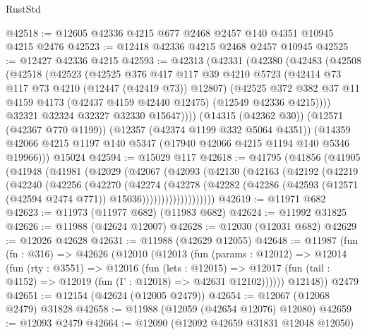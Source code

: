 \begin{lexlean}{RustStd}
\begin{coremodule}
@42518 := @12605 @42336 @4215 @677 @2468 @2457 @140 @4351 @10945 @4215 @2476
@42523 := @12418 @42336 @4215 @2468 @2457 @10945
@42525 := @12427 @42336 @4215
@42593 := @42313
    (@42331
      (@42380
        (@42483
          (@42508
            (@42518
              (@42523
                (@42525
                  @376
                  @417
                  @117
                  @39
                  @4210
                  @5723
                  (@42414 @73 @117 @73 @4210 (@12447 (@42419 @73)) @12807)
                  (@42525
                    @372
                    @382
                    @37
                    @11
                    @4159
                    @4173
                    (@42437 @4159 @42440 @12475)
                    (@12549 @42336 @4215))))
              @32321
              @32324
              @32327
              @32330
              @15647))))
      (@14315 (@42362 @30))
      (@12571 (@42367 @770 @1199))
      (@12357 (@42374 @1199 @332 @5064 @4351))
      (@14359 @42066 @4215 @1197 @140 @5347 (@17940 @42066 @4215 @1194 @140 @5346 @19966)))
    @15024
@42594 := @15029 @117
@42618 := @41795
    (@41856
      (@41905
        (@41948
          (@41981
            (@42029
              (@42067
                (@42093
                  (@42130
                    (@42163
                      (@42192
                        (@42219
                          (@42240
                            (@42256
                              (@42270
                                (@42274
                                  (@42278
                                    (@42282
                                      (@42286
                                        (@42593
                                          (@12571 (@42594 @2474 @771))
                                          @15036)))))))))))))))))))
@42619 := @11971 @682
@42623 := @11973 (@11977 @682) (@11983 @682)
@42624 := @11992 @31825
@42626 := @11988 (@42624 @12007)
@42628 := @12030 (@12031 @682)
@42629 := @12026 @42628
@42631 := @11988 (@42629 @12055)
@42648 := @11987
    (fun (fn : @316) =>
    @42626
      (@12010
        (@12013
          (fun (params : @12012) =>
          @12014
            (fun (rty : @3551) =>
            @12016
              (fun (lets : @12015) =>
              @12017 (fun (tail : @4152) => @12019 (fun (Γ : @12018) => @42631 @12102))))))
        @12148))
    @2479
@42651 := @12154 (@42624 (@12005 @2479))
@42654 := @12067 (@12068 @2479) @31828
@42658 := @11988 (@12059 (@42654 @12076) @12080)
@42659 := @12093 @2479
@42664 := @12090 (@12092 @42659 @31831 @12048 @12050)

\end{coremodule}
\end{lexlean}
